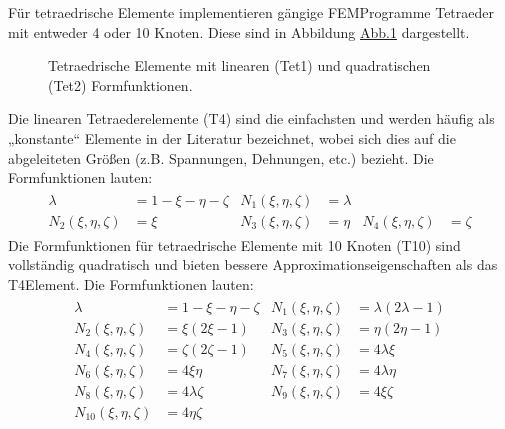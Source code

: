 \documentclass[letterpaper,10pt,german]{jupyterBook}
\let\sphinxpxdimen\pdfpxdimen\else\newdimen\sphinxpxdimen
\begin{document}
\sphinxAtStartPar
Für tetraedrische Elemente implementieren gängige FEM\sphinxhyphen{}Programme Tetraeder mit entweder 4 oder 10 Knoten. Diese sind in Abbildung \hyperref[\detokenize{chapters/chapter3/Ansatzfunktionen:tetraelements}]{Abb.\@ \ref{\detokenize{chapters/chapter3/Ansatzfunktionen:tetraelements}}} dargestellt.

\begin{figure}[htbp]
\centering
\capstart

\noindent\sphinxincludegraphics[width=500\sphinxpxdimen]{{TetElements}.png}
\caption{Tetraedrische Elemente mit linearen (Tet1) und quadratischen (Tet2) Formfunktionen.}\label{\detokenize{chapters/chapter3/Ansatzfunktionen:tetraelements}}\end{figure}

\sphinxAtStartPar
Die linearen Tetraederelemente (T4) sind die einfachsten und werden häufig als „konstante“ Elemente in der Literatur bezeichnet, wobei sich dies auf die abgeleiteten Größen (z.B. Spannungen, Dehnungen, etc.) bezieht. Die Formfunktionen lauten:
\begin{equation}\label{equation:chapters/chapter3/Ansatzfunktionen:3D_ShapeFunctions_T4}
\begin{split}\begin{align}
\lambda &= 1 - \xi - \eta - \zeta & N_1(\xi ,\eta ,\zeta ) &= \lambda \\
N_2(\xi ,\eta ,\zeta ) &= \xi & N_3(\xi ,\eta ,\zeta ) &= \eta & N_4(\xi ,\eta ,\zeta ) &= \zeta
\end{align}\end{split}
\end{equation}
\sphinxAtStartPar
Die Formfunktionen für tetraedrische Elemente mit 10 Knoten (T10) sind vollständig quadratisch und bieten bessere Approximationseigenschaften als das T4\sphinxhyphen{}Element. Die Formfunktionen lauten:
\begin{equation}\label{equation:chapters/chapter3/Ansatzfunktionen:3D_ShapeFunctions_T10}
\begin{split}\begin{align}
\lambda &= 1 - \xi - \eta - \zeta & N_1(\xi ,\eta ,\zeta ) &= \lambda (2\lambda - 1) \\
N_2(\xi ,\eta ,\zeta ) &= \xi (2\xi - 1) & N_3(\xi ,\eta ,\zeta ) &= \eta (2\eta - 1) \\
N_4(\xi ,\eta ,\zeta ) &= \zeta (2\zeta - 1) & N_5(\xi ,\eta ,\zeta ) &= 4\lambda \xi \\
N_6(\xi ,\eta ,\zeta ) &= 4\xi \eta & N_7(\xi ,\eta ,\zeta ) &= 4\lambda \eta \\
N_8(\xi ,\eta ,\zeta ) &= 4\lambda \zeta & N_9(\xi ,\eta ,\zeta ) &= 4\xi \zeta \\
N_{10}(\xi ,\eta ,\zeta ) &= 4\eta \zeta
\end{align}\end{split}
\end{equation}
\end{document}
